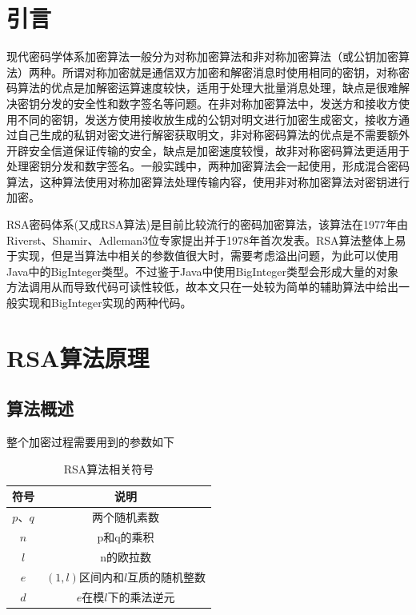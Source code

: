 \documentclass[UTF8,a4paper,10.5pt,twocolumn]{ctexart}
\newcommand{\wuhao}{\fontsize{10.5pt}{10.5pt}\selectfont}
\begin{document}
\section{引言}
    \par 现代密码学体系加密算法一般分为对称加密算法和非对称加密算法（或公钥加密算法）两种。所谓对称加密就是通信双方加密和解密消息时使用相同的密钥，对称密码算法的优点是加解密运算速度较快，适用于处理大批量消息处理，缺点是很难解决密钥分发的安全性和数字签名等问题。在非对称加密算法中，发送方和接收方使用不同的密钥，发送方使用接收放生成的公钥对明文进行加密生成密文，接收方通过自己生成的私钥对密文进行解密获取明文，非对称密码算法的优点是不需要额外开辟安全信道保证传输的安全，缺点是加密速度较慢，故非对称密码算法更适用于处理密钥分发和数字签名。一般实践中，两种加密算法会一起使用，形成混合密码算法，这种算法使用对称加密算法处理传输内容，使用非对称加密算法对密钥进行加密。
	\par RSA密码体系(又成RSA算法)是目前比较流行的密码加密算法，该算法在1977年由Riverst、Shamir、Adleman3位专家提出并于1978年首次发表。RSA算法整体上易于实现，但是当算法中相关的参数值很大时，需要考虑溢出问题，为此可以使用Java中的BigInteger类型。不过鉴于Java中使用BigInteger类型会形成大量的对象方法调用从而导致代码可读性较低，故本文只在一处较为简单的辅助算法中给出一般实现和BigInteger实现的两种代码。
 

\section{RSA算法原理}

\subsection{算法概述}
	\par 整个加密过程需要用到的参数如下

		\begin{table}[H] \wuhao  
		   \centering
		  \caption{RSA算法相关符号}\label{tab}
		  \begin{tabular}{c|c}
		    \toprule            
		    符号 & 说明 \\
		    \hline                
		    ${{p}\mbox{、}{q}}$ & 两个随机素数 \\
		    $n$ & p和q的乘积 \\
		    $l$ & n的欧拉数 \\
		    $e$ & $(1,l)$区间内和$l$互质的随机整数 \\
			$d$ & $e$在模$l$下的乘法逆元\\
		\bottomrule        
		  \end{tabular}
		\end{table}
\end{document}
